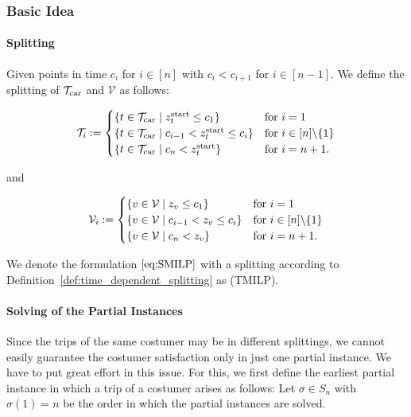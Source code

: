 \subsubsection{Basic Idea}
\label{sec:basic_idea}

\paragraph{Splitting} \parfill

\begin{definition}
\label{def:time_dependent_splitting}

Given points in time $c_i$ for $i\in[n]$ with $c_i<c_{i+1}$ for $i\in[n-1]$. We define the splitting of $\mathcal{T}_{\operatorname{car}}$ and $\mathcal{V}$ as follows:

\begin{align*}
	\mathcal{T}_i := \begin{cases}
		\left\{t\in\mathcal{T}_{\operatorname{car}}\mid z^{\operatorname{start}}_t\leq c_1\right\} & \text{for } i=1 \\
		\left\{t\in\mathcal{T}_{\operatorname{car}}\mid c_{i-1}<z^{\operatorname{start}}_t\leq c_i\right\} & \text{for } i\in[n]\backslash\{1\} \\
		\left\{t\in\mathcal{T}_{\operatorname{car}}\mid c_n<z^{\operatorname{start}}_t\right\} & \text{for } i=n+1.
	\end{cases}
\end{align*}

and

\begin{align*}
	\mathcal{V}_i := \begin{cases}
		\left\{v\in\mathcal{V}\mid z_v\leq c_1\right\} & \text{for } i=1 \\
		\left\{v\in\mathcal{V}\mid c_{i-1}<z_v\leq c_i\right\} & \text{for } i\in[n]\backslash\{1\} \\
		\left\{v\in\mathcal{V}\mid c_n<z_v\right\} & \text{for } i=n+1.
	\end{cases}
\end{align*}

\end{definition}

We denote the formulation $\eqref{eq:SMILP}$ with a splitting according to Definition~\ref{def:time_dependent_splitting} as (TMILP).

\paragraph{Solving of the Partial Instances} \parfill

Since the trips of the same costumer may be in different splittings, we cannot easily guarantee the costumer satisfaction only in just one partial instance. We have to put great effort in this issue. For this, we first define the earliest partial instance in which a trip of a costumer arises as follows: Let $\sigma\in S_n$ with $\sigma(1)=n$ be the order in which the partial instances are solved.

